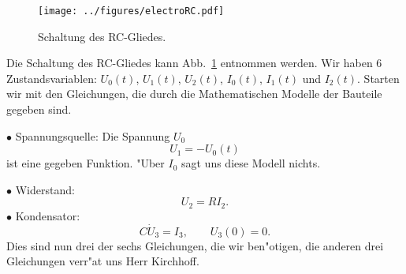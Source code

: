 \begin{figure}[htbp] %
   \centering
   \texttt{[image: ../figures/electroRC.pdf]} 
   \caption{Schaltung des RC-Gliedes.
   }
   \label{ele3}
\end{figure}

Die Schaltung des RC-Gliedes kann Abb.~\ref{ele3} entnommen werden. Wir haben 6 Zustandsvariablen: 
$U_0(t)$, $U_1(t)$, $U_2(t)$, $I_0(t)$, $I_1(t)$ und $I_2(t)$. Starten wir mit den Gleichungen, die durch die
Mathematischen Modelle der Bauteile gegeben sind.\par
$\bullet$ Spannungsquelle:
Die Spannung $U_0$ 
$$U_1 = - U_0(t)$$
ist eine gegeben Funktion. "Uber $I_0$ sagt uns diese Modell nichts.\par
$\bullet$ Widerstand:
$$U_2 = R I_2. $$
$\bullet$ Kondensator:
$$ C \dot U_3 = I_3,\qquad U_3(0) = 0.$$
Dies sind nun drei der sechs Gleichungen, die wir ben"otigen, die anderen drei
Gleichungen verr"at uns Herr Kirchhoff. 

